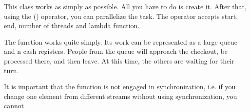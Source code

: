 This class works as simply as possible. All you have to do is create it. After that, using the () operator, you can parallelize the task. The operator accepts start, end, number of threads and lambda function. ~\newline


The function works quite simply. Its work can be represented as a large queue and n cash registers. People from the queue will approach the checkout, be processed there, and then leave. At this time, the others are waiting for their turn. ~\newline


It is important that the function is not engaged in synchronization, i.\+e. if you change one element from different streams without using synchronization, you cannot 